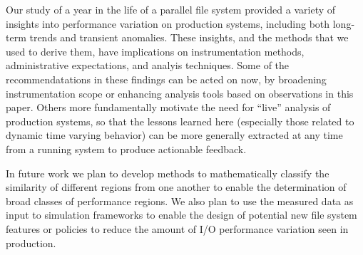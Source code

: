 Our study of a year in the life of a parallel file system provided a
variety of insights into performance variation on production systems,
including both long-term trends and transient anomalies.  These insights,
and the methods that we used to derive them, have implications on
instrumentation methods, administrative expectations, and analyis
techniques. Some of the recommendatations in these findings can be acted on
now, by broadening instrumentation
scope or enhancing analysis tools based on observations in this paper.
Others more fundamentally motivate the need for ``live'' analysis of
production systems, so that the lessons learned here (especially those
related to dynamic time varying behavior) can be more generally extracted
at any time from a running system to produce actionable feedback.

In future work we plan to develop methods to mathematically classify the similarity of different regions from one another to enable the determination of broad classes of performance regions. We also plan to use the measured data as input to simulation frameworks to enable the design of potential new file system features or policies to reduce the  amount of I/O performance variation seen in production. 

\endinput


